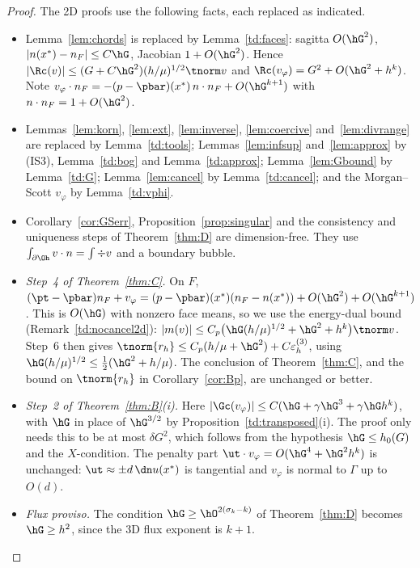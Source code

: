 \begin{proof}
The 2D proofs use the following facts, each replaced as indicated.
\begin{itemize}
\item Lemma~\ref{lem:chords} is replaced by Lemma~\ref{td:faces}: sagitta $O(\hG^2)$, $|n(x^\ast)-n_F|\le C\hG$, Jacobian $1+O(\hG^2)$. Hence $|\Rc(v)|\le(G+C\hG^2)(h/\mu)^{1/2}\tnorm v$ and $\Rc(v_\varphi)=G^2+O(\hG^2+h^k)$. Note $v_\varphi\cdot n_F=-(p-\pbar)(x^\ast)\,n\cdot n_F+O(\hG^{k+1})$ with $n\cdot n_F=1+O(\hG^2)$.
\item Lemmas~\ref{lem:korn}, \ref{lem:ext}, \ref{lem:inverse}, \ref{lem:coercive} and~\ref{lem:divrange} are replaced by Lemma~\ref{td:tools}; Lemmas~\ref{lem:infsup} and~\ref{lem:approx} by (IS3), Lemma~\ref{td:bog} and Lemma~\ref{td:approx}; Lemma~\ref{lem:Gbound} by Lemma~\ref{td:G}; Lemma~\ref{lem:cancel} by Lemma~\ref{td:cancel}; and the Morgan--Scott $v_\varphi$ by Lemma~\ref{td:vphi}.
\item Corollary~\ref{cor:GSerr}, Proposition~\ref{prop:singular} and the consistency and uniqueness steps of Theorem~\ref{thm:D} are dimension-free. They use $\int_{\partial\Oh}v\cdot n=\int\div v$ and a boundary bubble.
\item \emph{Step~4 of Theorem~\ref{thm:C}.} On $F$, $(\pt-\pbar)n_F+v_\varphi=(p-\pbar)(x^\ast)(n_F-n(x^\ast))+O(\hG^2)+O(\hG^{k+1})$. This is $O(\hG)$ with nonzero face means, so we use the energy-dual bound (Remark~\ref{td:nocancel2d}): $|m(v)|\le C_p\bigl(\hG(h/\mu)^{1/2}+\hG^2+h^k\bigr)\tnorm v$. Step~6 then gives $\tnorm{r_h}\le C_p(h/\mu+\hG^2)+C\epsd$, using $\hG(h/\mu)^{1/2}\le\frac12(\hG^2+h/\mu)$. The conclusion of Theorem~\ref{thm:C}, and the bound on $\tnorm{r_h}$ in Corollary~\ref{cor:Bp}, are unchanged or better.
\item \emph{Step~2 of Theorem~\ref{thm:B}(i).} Here $|\Gc(v_\varphi)|\le C(\hG+\gamma\hG^3+\gamma\hG h^k)$, with $\hG$ in place of $\hG^{3/2}$ by Proposition~\ref{td:transposed}(i). The proof only needs this to be at most $\delta G^2$, which follows from the hypothesis $\hG\le h_0(G)$ and the $X$-condition. The penalty part $\ut\cdot v_\varphi=O(\hG^4+\hG^2h^k)$ is unchanged: $\ut\approx\pm d\,\dn u(x^\ast)$ is tangential and $v_\varphi$ is normal to $\Gamma$ up to $O(d)$.
\item \emph{Flux proviso.} The condition $\hG\ge\hO^{2(\sigma_k-k)}$ of Theorem~\ref{thm:D} becomes $\hG\ge h^2$, since the 3D flux exponent is $k+1$.\qedhere
\end{itemize}
\end{proof}


